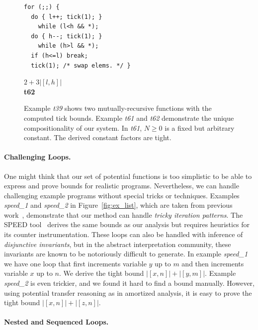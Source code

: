 \documentclass[nocopyrightspace,preprint,pldi]{sigplanconf-pldi15}
\newcommand{\ifshort}[2]{\ifx\fullversion\undefined{#1}\else{#2}\fi}
\newcommand{\paraskip}[0]{\ifshort{\vspace{-2pt}}{}}
\begin{document}
\begin{figure}
\begin{minipage}[b]{5.5cm}
\begin{center}
\begin{lstlisting}
   \end{lstlisting}
\vspace{-2.5ex}
\begin{lstlisting}
for (;;) {
  do { l++; tick(1); }
    while (l<h && *);
  do { h--; tick(1); }
    while (h>l && *);
  if (h<=l) break;
  tick(1); /* swap elems. */ }
\end{lstlisting}
$2+3|[l,h]|$
\\[.4\baselineskip]
      {\bf t62}
    \end{center}
  \end{minipage}
\vspace{1ex}
\caption{Example \emph{t39} shows two mutually-recursive functions
  with the computed tick bounds.  Example \emph{t61} and \emph{t62}
  demonstrate the unique compositionality of our system. In \emph{t61},
  $N\geq 0$ is a fixed but arbitrary constant.  The derived constant factors
  are tight.}
  \label{fig:ex_list_2}
\end{figure}



\paraskip
\paragraph{Challenging Loops.}

One might think that our set of potential functions is too simplistic
to be able to express and prove bounds for realistic
programs. Nevertheless, we can handle challenging example programs
without special tricks or techniques.  Examples \emph{speed\_1} and
\emph{speed\_2} in Figure~\ref{fig:ex_list}, which are taken from previous work~\cite{GulwaniMC09},
demonstrate that our method can handle \emph{tricky iteration
  patterns}.  The SPEED tool~\cite{GulwaniMC09} derives the same
bounds as our analysis but requires heuristics for its counter
instrumentation.  These loops can also be handled with inference of
\emph{disjunctive invariants}, but in the abstract interpretation
community, these invariants are known to be notoriously difficult to
generate.
%
In example \emph{speed\_1} we have one loop that first increments
variable $y$ up to $m$ and then increments variable $x$ up to $n$.  We
derive the tight bound $|[x, n]| + |[y, m]|$.
%
Example \emph{speed\_2} is even trickier, and we found it hard to
find a bound manually.  However, using potential transfer reasoning as
in amortized analysis, it is easy to prove the tight bound
$|[x, n]| + |[z, n]|$.

\paraskip
\paragraph{Nested and Sequenced Loops.}
\end{document}
